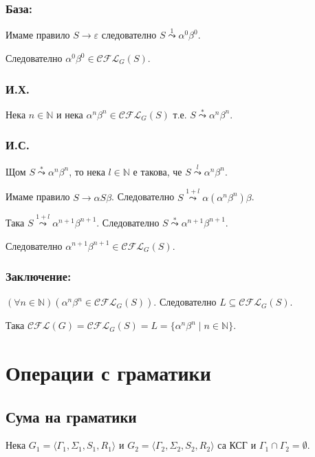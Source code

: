\documentclass[12pt]{article}
\begin{document}
\subsubsection*{База:}
Имаме правило \(S \to \varepsilon\) следователно \(S \overset{1}{\leadsto} \alpha^0 \beta^0\).

Следователно \(\alpha^0 \beta^0 \in \mathcal{CFL}_G(S)\).

\subsubsection*{И.Х.}
Нека \(n \in \mathbb N\) и нека \(\alpha^n \beta^n \in \mathcal{CFL}_G(S)\) т.е. \(S \overset{*}{\leadsto} \alpha^n \beta^n \).

\subsubsection*{И.С.}
Щом \(S \overset{*}{\leadsto} \alpha^n \beta^n \), то нека \(l \in \mathbb N\) е такова, че \(S \overset{l}{\leadsto} \alpha^n \beta^n\).

Имаме правило \(S \to \alpha S \beta\). Следователно \(S \overset{1 + l}{\leadsto} \alpha(\alpha^n \beta^n) \beta\).

Така \(S \overset{1 + l}{\leadsto} \alpha^{n + 1} \beta^{n + 1}\). Следователно \(S \overset{*}{\leadsto} \alpha^{n + 1} \beta^{n + 1}\).

Следователно \(\alpha^{n + 1} \beta^{n + 1} \in \mathcal{CFL}_G(S)\).

\subsubsection*{Заключение:}
\((\forall n \in \mathbb N)(\alpha^n \beta^n \in \mathcal{CFL}_G(S))\).
Следователно \(L \subseteq \mathcal{CFL}_G(S)\).

Така \(\mathcal{CFL}(G) = \mathcal{CFL}_G(S) = L = \{\alpha^n \beta^n \mid n \in \mathbb N\}\).

\section*{Операции с граматики}

\subsection*{Сума на граматики}
Нека \(G_1 = \langle \Gamma_1, \Sigma_1, S_1, R_1 \rangle\) и \(G_2 = \langle \Gamma_2, \Sigma_2, S_2, R_2 \rangle\) са КСГ и \(\Gamma_1 \cap \Gamma_2 = \emptyset\).
\end{document}
